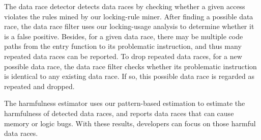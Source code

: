  The data race 
detector detects data races by checking whether a given access violates the 
rules mined by our locking-rule miner. After finding a possible data race, the 
data race filter uses our locking-usage analysis to determine whether it is a 
false positive. Besides, for a given data race, there may be multiple code 
paths from the entry function to its problematic instruction, and thus many 
repeated data races can be reported. To drop repeated data races, for a new 
possible data race, the data race filter checks whether its problematic 
instruction is identical to any existing data race. If so, this possible data 
race is regarded as repeated and dropped.

 The harmfulness estimator uses our 
pattern-based estimation to estimate the harmfulness of detected data races, 
and reports data races that can cause memory or logic bugs. With these results, 
developers can focus on those harmful data races.
